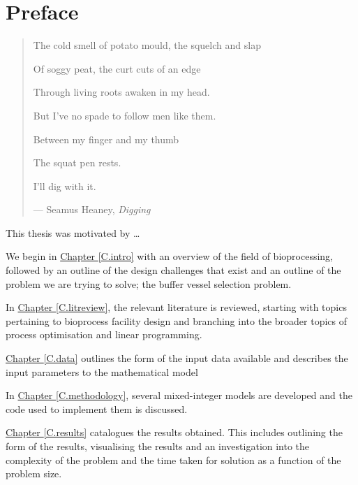 %
%
%
%

\chapter*{Preface}

\begin{quote}
The cold smell of potato mould, the squelch and slap

Of soggy peat, the curt cuts of an edge

Through living roots awaken in my head.

But I've no spade to follow men like them.

Between my finger and my thumb

The squat pen rests.

I'll dig with it.

\hspace{2cm}--- Seamus Heaney, \emph{Digging}
\end{quote}

This thesis was motivated by \ldots

We begin in \hyperref[C.intro]{Chapter \ref*{C.intro}} with an overview of the
field of bioprocessing, followed by an outline of the design challenges that
exist and an outline of the problem we are trying to solve; the buffer vessel
selection problem.

In \hyperref[C.litreview]{Chapter \ref*{C.litreview}}, the relevant literature
is reviewed, starting with topics pertaining to bioprocess facility design and
branching into the broader topics of process optimisation and linear
programming.

\hyperref[C.data]{Chapter \ref*{C.data}} outlines the form of the input data
available and describes the input parameters to the mathematical model

In \hyperref[C.methodology]{Chapter \ref*{C.methodology}}, several
mixed-integer models are developed and the code used to implement them is
discussed.

\hyperref[C.results]{Chapter \ref*{C.results}} catalogues the results obtained.
This includes outlining the form of the results, visualising the results and
an investigation into the complexity of the problem and the time taken for
solution as a function of the problem size.

